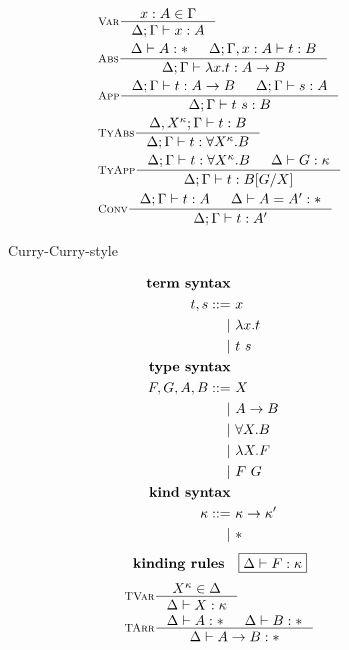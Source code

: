 \begin{figure}
\begin{singlespace}
\begin{minipage}{.46\textwidth}
\begin{align*}
& \inference[\sc Var]{x:A \in \Gamma}{\Delta;\Gamma |- x:A} \\
& \inference[\sc Abs]{\Delta |- A:* & \Delta;\Gamma,x:A |- t : B}
		     {\Delta;\Gamma |- \l x   .t : A -> B} \\
& \inference[\sc App]{\Delta;\Gamma |- t : A -> B & \Delta;\Gamma |- s : A}
		     {\Delta;\Gamma |- t~s : B} \\
& \inference[\sc TyAbs]{\Delta,X^\kappa;\Gamma |- t : B}
		       {\Delta;\Gamma |- t : \forall X^\kappa.B} \\
& \inference[\sc TyApp]{\Delta;\Gamma |- t : \forall X^\kappa.B & \Delta |- G:\kappa}
		       {\Delta;\Gamma |- t : B[G/X]} \\
& \inference[\sc Conv]{\Delta;\Gamma |- t : A & \Delta |- A = A' : *}
		      {\Delta;\Gamma |- t : A'}
\end{align*}
\end{minipage}
\begin{minipage}{.46\textwidth}
	\begin{center}Curry-Curry-style\end{center}
\def\baselinestretch{0}
\small
\begin{align*}
\textbf{term syntax} \\
t,s ::= &~ x           \\
      | &~ \lambda x    . t \\
      | &~ t ~ s       \\
\textbf{type syntax} \\
F,G,A,B ::= &~ X                  \\
          | &~ A -> B             \\   
          | &~ \forall X.B \\
          | &~ \lambda X.F      \\
          | &~ F ~ G              \\
\textbf{kind syntax} \\
\kappa ::= &~ \kappa -> \kappa'  \\
         | &~ *                  \\
\end{align*}
\[ \textbf{kinding rules} \quad \framebox{$ \Delta |- F:\kappa $} \]\vspace*{-1em}
\begin{align*}
& \inference[\sc TVar]{X^\kappa \in \Delta}{\Delta |- X:\kappa} \\
& \inference[\sc TArr]{\Delta |- A:* & \Delta |- B:*}{\Delta |- A -> B:*} \\

\end{align*}
\end{minipage}
\end{singlespace}
\end{figure}
